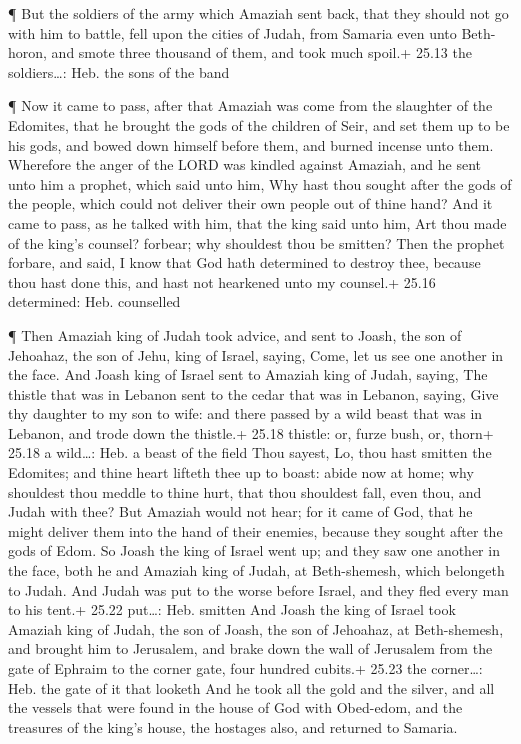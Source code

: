  ¶ But the soldiers of the army which Amaziah sent back,
that they should not go with him to battle, fell upon the cities of
Judah, from Samaria even unto Beth-horon, and smote three thousand of
them, and took much spoil.+ 25.13 the soldiers\ldots: Heb. the sons of
the band

 ¶ Now it came to pass, after that Amaziah was come from
the slaughter of the Edomites, that he brought the gods of the children
of Seir, and set them up to be his gods, and bowed down himself before
them, and burned incense unto them.  Wherefore the anger of
the LORD was kindled against Amaziah, and he sent unto him a prophet,
which said unto him, Why hast thou sought after the gods of the people,
which could not deliver their own people out of thine hand?
 And it came to pass, as he talked with him, that the king
said unto him, Art thou made of the king's counsel? forbear; why
shouldest thou be smitten? Then the prophet forbare, and said, I know
that God hath determined to destroy thee, because thou hast done this,
and hast not hearkened unto my counsel.+ 25.16 determined: Heb.
counselled

 ¶ Then Amaziah king of Judah took advice, and sent to
Joash, the son of Jehoahaz, the son of Jehu, king of Israel, saying,
Come, let us see one another in the face.  And Joash king
of Israel sent to Amaziah king of Judah, saying, The thistle that was in
Lebanon sent to the cedar that was in Lebanon, saying, Give thy daughter
to my son to wife: and there passed by a wild beast that was in Lebanon,
and trode down the thistle.+ 25.18 thistle: or, furze bush, or, thorn+
25.18 a wild\ldots: Heb. a beast of the field  Thou sayest,
Lo, thou hast smitten the Edomites; and thine heart lifteth thee up to
boast: abide now at home; why shouldest thou meddle to thine hurt, that
thou shouldest fall, even thou, and Judah with thee?  But
Amaziah would not hear; for it came of God, that he might deliver them
into the hand of their enemies, because they sought after the gods of
Edom.  So Joash the king of Israel went up; and they saw
one another in the face, both he and Amaziah king of Judah, at
Beth-shemesh, which belongeth to Judah.  And Judah was put
to the worse before Israel, and they fled every man to his tent.+ 25.22
put\ldots: Heb. smitten  And Joash the king of Israel took
Amaziah king of Judah, the son of Joash, the son of Jehoahaz, at
Beth-shemesh, and brought him to Jerusalem, and brake down the wall of
Jerusalem from the gate of Ephraim to the corner gate, four hundred
cubits.+ 25.23 the corner\ldots: Heb. the gate of it that looketh
 And he took all the gold and the silver, and all the
vessels that were found in the house of God with Obed-edom, and the
treasures of the king's house, the hostages also, and returned to
Samaria.

